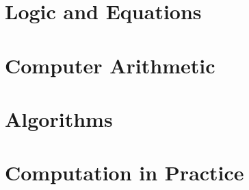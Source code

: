 \documentclass[7x9]{newmath}
\begin{document}



\part{Logic and Equations}







\part{Computer Arithmetic}





\part{Algorithms}






\part{Computation in Practice}





\endmatter

\printindex
\end{document}
